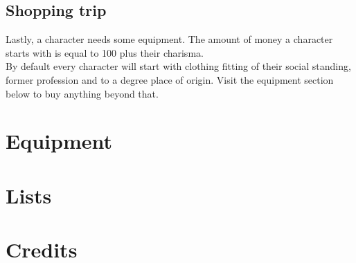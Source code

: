 \documentclass[12pt,a4paper,openany,usenames,dvipsnames]{book}
\begin{document}
	\section{Shopping trip}
	Lastly, a character needs some equipment. The amount of money a character starts with is equal to 100 plus their charisma. \\
	By default every character will start with clothing fitting of their social standing, former profession and to a degree place of origin. Visit the equipment section below to buy anything beyond that.

	\chapter{Equipment}
	
	
	
	
	
	

	
%	

	\chapter{Lists}
	
	
	

	
	
	
	

	

	
	
	

	\chapter{Credits}
	
\end{document}
